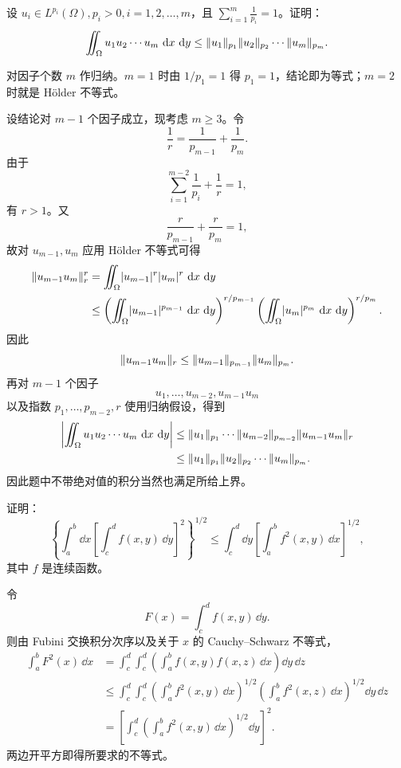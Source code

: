\begin{xexercise}[7]
设 $u_i\in L^{p_i}(\Omega),p_i>0,i=1,2,\ldots,m$，且 $\sum_{i=1}^m\frac1{p_i}=1$。证明：
  \[
    \iint_\Omega u_1u_2\cdots u_m\,\dd x\,\dd y
    \le\norm{u_1}_{p_1}\norm{u_2}_{p_2}\cdots\norm{u_m}_{p_m}.
  \]
\end{xexercise}
\begin{xsolution}
对因子个数 $m$ 作归纳。$m=1$ 时由 $1/p_1=1$ 得 $p_1=1$，结论即为等式；$m=2$ 时就是 Hölder 不等式。

设结论对 $m-1$ 个因子成立，现考虑 $m\ge3$。令
\[
 \frac1r=\frac1{p_{m-1}}+\frac1{p_m}.
\]
由于
\[
 \sum_{i=1}^{m-2}\frac1{p_i}+\frac1r=1,
\]
有 $r>1$。又
\[
 \frac{r}{p_{m-1}}+\frac{r}{p_m}=1,
\]
故对 $u_{m-1},u_m$ 应用 Hölder 不等式可得
\begin{align*}
 \norm{u_{m-1}u_m}_r^r
 &=\iint_\Omega\abs{u_{m-1}}^r\abs{u_m}^r\,\dd x\,\dd y\\
 &\le
 \left(\iint_\Omega\abs{u_{m-1}}^{p_{m-1}}\,\dd x\,\dd y\right)^{r/p_{m-1}}
 \left(\iint_\Omega\abs{u_m}^{p_m}\,\dd x\,\dd y\right)^{r/p_m}.
\end{align*}
因此
\[
 \norm{u_{m-1}u_m}_r
 \le\norm{u_{m-1}}_{p_{m-1}}\norm{u_m}_{p_m}.
\]
再对 $m-1$ 个因子
\[
 u_1,\ldots,u_{m-2},u_{m-1}u_m
\]
以及指数 $p_1,\ldots,p_{m-2},r$ 使用归纳假设，得到
\begin{align*}
 \abs*{\iint_\Omega u_1u_2\cdots u_m\,\dd x\,\dd y}
 &\le\norm{u_1}_{p_1}\cdots\norm{u_{m-2}}_{p_{m-2}}
 \norm{u_{m-1}u_m}_r\\
 &\le\norm{u_1}_{p_1}\norm{u_2}_{p_2}\cdots\norm{u_m}_{p_m}.
\end{align*}
因此题中不带绝对值的积分当然也满足所给上界。
\end{xsolution}


\begin{xexercise}[8]
证明：
  \[
    \left\{\int_a^b\dd x\left[\int_c^d f(x,y)\,\dd y\right]^2\right\}^{1/2}
    \le\int_c^d\dd y\left[\int_a^b f^2(x,y)\,\dd x\right]^{1/2},
  \]
  其中 $f$ 是连续函数。
\end{xexercise}
\begin{xsolution}
令
\[
 F(x)=\int_c^df(x,y)\,\dd y.
\]
则由 Fubini 交换积分次序以及关于 $x$ 的 Cauchy--Schwarz 不等式，
\begin{align*}
 \int_a^bF^2(x)\,\dd x
 &=\int_c^d\int_c^d
 \left(\int_a^bf(x,y)f(x,z)\,\dd x\right)\dd y\,\dd z\\
 &\le\int_c^d\int_c^d
 \left(\int_a^bf^2(x,y)\,\dd x\right)^{1/2}
 \left(\int_a^bf^2(x,z)\,\dd x\right)^{1/2}
 \dd y\,\dd z\\
 &=\left[
 \int_c^d\left(\int_a^bf^2(x,y)\,\dd x\right)^{1/2}\dd y
 \right]^2.
\end{align*}
两边开平方即得所要求的不等式。
\end{xsolution}


